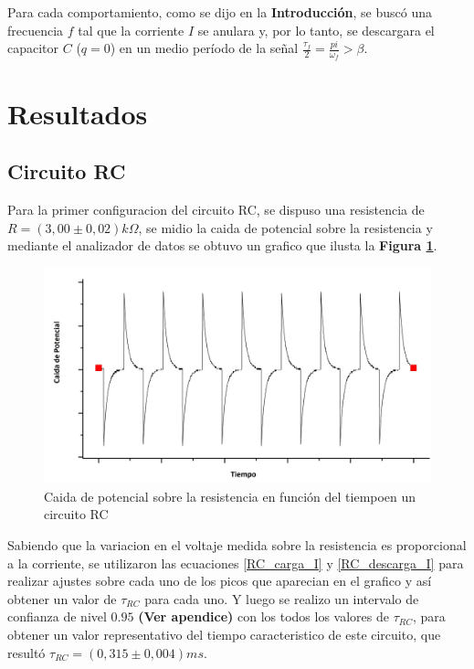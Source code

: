 \documentclass[11pt,a4paper]{article}
\begin{document}
Para cada comportamiento, como se dijo en la \textbf{Introducción}, se buscó una frecuencia $f$ tal que la corriente $I$ se anulara y, por lo tanto, se descargara el capacitor $C$ ($q=0$) en un medio período de la señal $\frac{\tau_f}{2} = \frac{pi}{\omega_f} > \beta$.

\newpage


\section{Resultados}
\label{sec:discusion}

\subsection{Circuito RC}
Para la primer configuracion del circuito RC, se dispuso una resistencia de $R = (3,00\pm0,02)k\Omega$, se midio la caida de potencial sobre la resistencia y mediante el analizador de datos se obtuvo un grafico que ilusta la \textbf{Figura \ref{fig:RC-CR}}.

\begin{figure}[H]
\centering
\includegraphics[scale=0.45]{RC-Caida_en_Resistencia}
  \caption{Caida de potencial sobre la resistencia en función del tiempoen un circuito RC}
  \label{fig:RC-CR}
\end{figure}

Sabiendo que la variacion en el voltaje medida sobre la resistencia es proporcional a la corriente, se utilizaron las ecuaciones \eqref{RC_carga_I} y  \eqref{RC_descarga_I} para realizar ajustes sobre cada uno de los picos que aparecian en el grafico y así obtener un valor de $\tau_{RC}$ para cada uno. Y luego se realizo un intervalo de confianza de nivel $0.95$ \textbf{(Ver apendice)} con los todos los valores de $\tau_{RC}$, para obtener un valor representativo del tiempo caracteristico de este circuito, que resultó $\tau_{RC}=(0,315 \pm 0,004) ms$.
\end{document}
